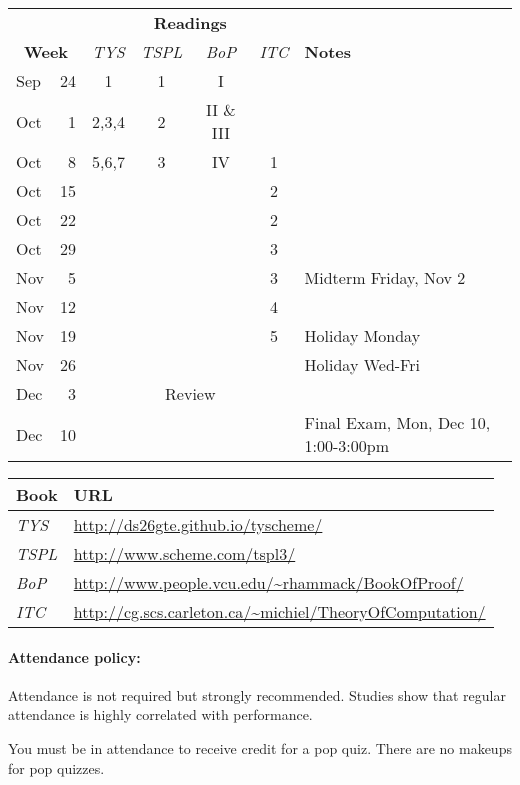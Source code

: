 \documentclass{article}
\begin{document}
  \begin{center}
\begin{tabular}{lr|cccc|l}                      
& & \multicolumn{4}{c|}{\bf Readings} &  \\
\multicolumn{2}{c|}{\bf Week} &\em TYS & \em TSPL &\em BoP&\em ITC & {\bf Notes} \\\hline  
Sep & 24  & 1 & 1 & I   &   \\
Oct & 1 & 2,3,4 & 2 & II \& III  & & \\
Oct & 8 & 5,6,7 & 3 & IV  & 1 \\
Oct & 15 &  &   &    & 2 \\
Oct & 22 &  &   &     & 2 \\
Oct & 29 &  &   &     & 3 & \\
Nov & 5 &  &   &     & 3 & Midterm Friday, Nov 2 \\
Nov & 12 &  &   &     & 4\\
Nov & 19 &  &   &     & 5 & Holiday Monday\\
Nov & 26 &  &  &      &  & Holiday Wed-Fri \\                 
Dec & 3   &  \multicolumn{4}{c|}{Review} & \\                 
Dec & 10  &  &   &     &   & Final Exam, Mon, Dec 10, 1:00-3:00pm \\
\end{tabular}

\begin{tabular}{ll}
Book & URL\\\hline
{\em TYS} &       \url{http://ds26gte.github.io/tyscheme/} \\
{\em TSPL} & \url{http://www.scheme.com/tspl3/} \\
{\em BoP} & \url{http://www.people.vcu.edu/~rhammack/BookOfProof/}\\
{\em ITC} & \url{http://cg.scs.carleton.ca/~michiel/TheoryOfComputation/}\\
\end{tabular}

\end{center}

\paragraph{Attendance policy:} Attendance is not required but strongly
  recommended.  Studies show that regular attendance is highly
  correlated with performance.

  You must be in attendance to receive credit for a pop quiz.  There
  are no makeups for pop quizzes.
\end{document}
